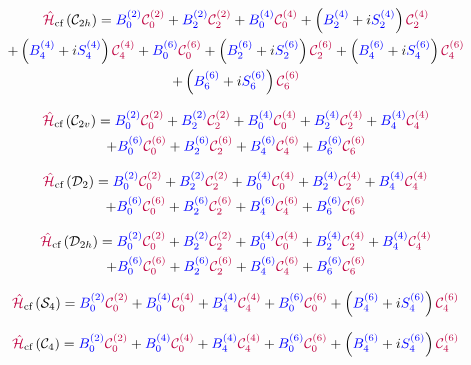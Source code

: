 \begin{multline}
\hamCrystalFieldSymbol\left(\groupSymbol{C}{2h}\right)  = \Bkq{2}{0} \Ckq{2}{0} + 
 \Bkq{2}{2} \Ckq{2}{2} + 
 \Bkq{4}{0} \Ckq{4}{0} + 
 \left(\Bkq{4}{2} + \iu \Skq{4}{2}\right) \Ckq{4}{2} \\ 
 + \left(\Bkq{4}{4} + \iu \Skq{4}{4}\right) \Ckq{4}{4} + 
 \Bkq{6}{0} \Ckq{6}{0} + 
 \left(\Bkq{6}{2} + \iu \Skq{6}{2}\right) \Ckq{6}{2} + 
 \left(\Bkq{6}{4} + \iu \Skq{6}{4}\right) \Ckq{6}{4} \\ 
 + \left(\Bkq{6}{6} + \iu \Skq{6}{6}\right) \Ckq{6}{6}
\label{eqn:cf:C2h}
\end{multline}


\begin{multline}
\hamCrystalFieldSymbol\left(\groupSymbol{C}{2v}\right)  = \Bkq{2}{0} \Ckq{2}{0} + 
 \Bkq{2}{2} \Ckq{2}{2} + 
 \Bkq{4}{0} \Ckq{4}{0} + 
 \Bkq{4}{2} \Ckq{4}{2} + 
 \Bkq{4}{4} \Ckq{4}{4} \\ 
 + \Bkq{6}{0} \Ckq{6}{0} + 
 \Bkq{6}{2} \Ckq{6}{2} + 
 \Bkq{6}{4} \Ckq{6}{4} + 
 \Bkq{6}{6} \Ckq{6}{6}
\label{eqn:cf:C2v}
\end{multline}


\begin{multline}
\hamCrystalFieldSymbol\left(\groupSymbol{D}{2}\right)  = \Bkq{2}{0} \Ckq{2}{0} + 
 \Bkq{2}{2} \Ckq{2}{2} + 
 \Bkq{4}{0} \Ckq{4}{0} + 
 \Bkq{4}{2} \Ckq{4}{2} + 
 \Bkq{4}{4} \Ckq{4}{4} \\ 
 + \Bkq{6}{0} \Ckq{6}{0} + 
 \Bkq{6}{2} \Ckq{6}{2} + 
 \Bkq{6}{4} \Ckq{6}{4} + 
 \Bkq{6}{6} \Ckq{6}{6}
\label{eqn:cf:D2}
\end{multline}


\begin{multline}
\hamCrystalFieldSymbol\left(\groupSymbol{D}{2h}\right)  = \Bkq{2}{0} \Ckq{2}{0} + 
 \Bkq{2}{2} \Ckq{2}{2} + 
 \Bkq{4}{0} \Ckq{4}{0} + 
 \Bkq{4}{2} \Ckq{4}{2} + 
 \Bkq{4}{4} \Ckq{4}{4} \\ 
 + \Bkq{6}{0} \Ckq{6}{0} + 
 \Bkq{6}{2} \Ckq{6}{2} + 
 \Bkq{6}{4} \Ckq{6}{4} + 
 \Bkq{6}{6} \Ckq{6}{6}
\label{eqn:cf:D2h}
\end{multline}


\begin{multline}
\hamCrystalFieldSymbol\left(\groupSymbol{S}{4}\right)  = \Bkq{2}{0} \Ckq{2}{0} + 
 \Bkq{4}{0} \Ckq{4}{0} + 
 \Bkq{4}{4} \Ckq{4}{4} + 
 \Bkq{6}{0} \Ckq{6}{0} + 
 \left(\Bkq{6}{4} + \iu \Skq{6}{4}\right) \Ckq{6}{4}
\label{eqn:cf:S4}
\end{multline}


\begin{multline}
\hamCrystalFieldSymbol\left(\groupSymbol{C}{4}\right)  = \Bkq{2}{0} \Ckq{2}{0} + 
 \Bkq{4}{0} \Ckq{4}{0} + 
 \Bkq{4}{4} \Ckq{4}{4} + 
 \Bkq{6}{0} \Ckq{6}{0} + 
 \left(\Bkq{6}{4} + \iu \Skq{6}{4}\right) \Ckq{6}{4}
\label{eqn:cf:C4}
\end{multline}


